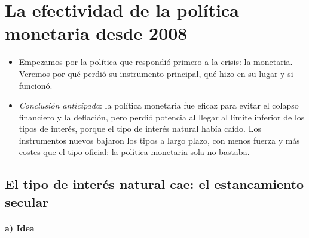 \documentclass[11pt]{article}
\begin{document}
\section{La efectividad de la política monetaria desde 2008}\label{sec:monetaria}

\begin{itemize}
\item Empezamos por la política que respondió primero a la crisis: la monetaria. Veremos por qué perdió su instrumento principal, qué hizo en su lugar y si funcionó.
\item \emph{Conclusión anticipada}: la política monetaria fue eficaz para evitar el colapso financiero y la deflación, pero perdió potencia al llegar al límite inferior de los tipos de interés, porque el tipo de interés natural había caído. Los instrumentos nuevos bajaron los tipos a largo plazo, con menos fuerza y más costes que el tipo oficial: la política monetaria sola no bastaba.
\end{itemize}

\subsection{El tipo de interés natural cae: el estancamiento secular}\label{sec:estancamiento}

\paragraph{a) Idea}
\end{document}
